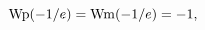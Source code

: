$\mathop{\mathrm{Wp}\/}\nolimits\!\left(-1/e\right)=\mathop{\mathrm{Wm}\/}%
\nolimits\!\left(-1/e\right)=-1,$